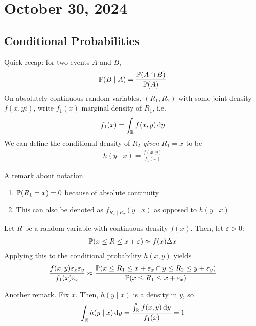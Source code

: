 \section{October 30, 2024}

\subsection{Conditional Probabilities}
Quick recap: for two events $A$ and $B$,
\begin{align}
    \mathbb{P}(B \mid A) = \frac{\mathbb{P}(A \cap B)}{\mathbb{P}(A)}
\end{align}
On absolutely continuous random variables, $(R_1,R_2)$ with some joint density $f(x, yi)$, write $f_1(x)$ marginal density of $R_1$, i.e.
\begin{align}
    f_1(x) = \int_{\mathbb{R}} f(x,y) \dd{y}
\end{align}
We can define the conditional density of $R_2$ \textit{given} $R_1 = x$ to be
\begin{align}
    h(y \mid x) = \frac{f(x,y)}{f_1(x)}
\end{align}

\begin{aside}
    A remark about notation
    \begin{enumerate}
        \item $\mathbb{P}(R_1 = x) = 0$ because of absolute continuity
        \item This can also be denoted as $f_{R_2 \mid R_2}(y \mid x)$ as opposed to $h(y \mid x)$
    \end{enumerate}
\end{aside}

Let $R$ be a random variable with continuous density $f(x)$. Then, let $\varepsilon > 0$:
\begin{align}
    \mathbb{P}(x \le R \le x + \varepsilon) \approx f(x) \Delta x
\end{align}
Applying this to the conditional probability $h(x,y)$ yields
\begin{align}
    \frac{f(x,y) \varepsilon_x \varepsilon_y}{f_1(x) \varepsilon_x} \approx \dfrac{\mathbb{P}(x \le R_1 \le x + \varepsilon_x \cap y \le R_2 \le y + \varepsilon_y)}{\mathbb{P}(x \le R_1 \le x + \varepsilon_x)}
\end{align}

\begin{aside}
    Another remark. Fix $x$. Then, $h(y \mid x)$ is a density in $y$, so
    \begin{align}
        \int_{\mathbb{R}} h(y \mid x) \dd{y} = \frac{\int_{\mathbb{R}} f(x,y)\dd{y}}{f_1(x)} = 1
    \end{align}
\end{aside}

